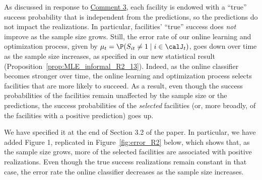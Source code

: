 \documentclass[11pt]{article}
\begin{document}
As discussed in response to \hyperref[R2:3]{\color{blue}Comment 3}, each facility is endowed with a ``true'' success probability that is independent from the predictions, so the predictions do not impact the realizations. In particular, facilities' ``true'' success does \textit{not} improve as the sample size grows. Still, the error rate of our online learning and optimization process, given by $\mu_t = \P(S_{it}\neq 1 \mid i\in\calJ_t)$, goes down over time as the sample size increases, as specified in our new statistical result (Proposition~\ref{prop:MLE_informal_R2_13}). Indeed, as the online classifier becomes stronger over time, the online learning and optimization process selects facilities that are more likely to succeed. As a result, even though the success probabilities of the facilities remain unaffected by the sample size or the predictions, the success probabilities of the \textit{selected} facilities (or, more broadly, of the facilities with a positive prediction) goes up.

We have specified it at the end of Section 3.2 of the paper. In particular, we have added Figure 1, replicated in Figure~\ref{fig:error_R2} below, which shows that, as the sample size grows, more of the selected facilities are associated with positive realizations. Even though the true success realizations remain constant in that case, the error rate the online classifier decreases as the sample size increases.
\end{document}
